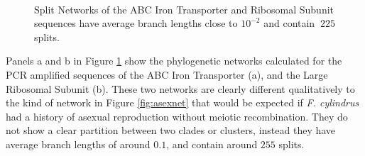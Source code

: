 \begin{figure}
\centering
{}\\
\caption{Split Networks of the ABC Iron Transporter and Ribosomal Subunit sequences have average branch lengths close to $10^{-2}$ and contain $~225$ splits. \label{fig:realnets}}
\end{figure}

Panels a and b in Figure \ref{fig:realnets} show the phylogenetic networks calculated for the PCR amplified sequences of the ABC Iron Transporter (a), and the Large Ribosomal Subunit (b).
These two networks are clearly different qualitatively to the kind of network in Figure \ref{fig:asexnet} that would be expected if \textit{F. cylindrus} had a history of asexual reproduction without meiotic recombination.
They do not show a clear partition between two clades or clusters, instead they have average branch lengths of around $0.1$, and contain around $255$ splits. 

